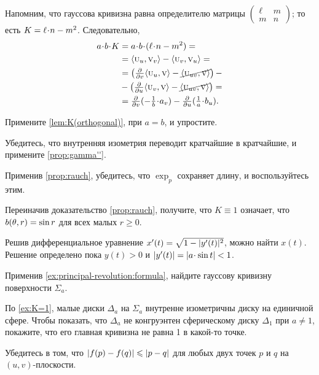 \begin{multicols}{2}
Напомним, что гауссова кривизна равна определителю матрицы $
(\begin{smallmatrix}
\ell&m
\\
m&n
\end{smallmatrix}
)
$;
то есть $K\z=\ell\cdot n-m^2$.
Следовательно, 
\begin{align*}
a\cdot b\cdot K
&=
a\cdot b\cdot(\ell\cdot n-m^2)
=
\\
&=
\langle\vec u_u,\vec v_v\rangle 
-
\langle\vec u_v,\vec v_u\rangle= 
\\
&= 
\left(
\tfrac{\partial}{\partial v}
\langle\vec u_u,\vec v\rangle
-
\cancel{\langle\vec u_{uv},\vec v\rangle}
\right)-
\\
&-
\left(
\tfrac{\partial}{\partial u}
\langle\vec u_v,\vec v\rangle
-
\cancel{\langle\vec u_{uv},\vec v\rangle}
\right)=
\\
&=\tfrac{\partial}{\partial v}(-\tfrac1{b}\cdot a_v)
-
\tfrac{\partial}{\partial u}(\tfrac1{a}\cdot b_u).
\end{align*}

Примените \ref{lem:K(orthogonal)}, при $a=b$, и упростите.

Убедитесь, что внутренняя изометрия переводит кратчайшие в кратчайшие, и примените \ref{prop:gamma''}.

Применив \ref{prop:rauch}, убедитесь, что $\exp_p$ сохраняет длину, и воспользуйтесь этим.

Переиначив доказательство \ref{prop:rauch}, получите, что $K\equiv 1$ означает, что $b(\theta,r)\z=\sin r$ для всех малых $r\ge 0$.

Решив дифференциальное уравнение $x'(t)\z=\sqrt{1-|y'(t)|^2}$, можно найти $x(t)$.
Решение определено пока $y(t)>0$ и $|y'(t)|\z=|a\cdot \sin t|<1$.

Применив \ref{ex:principal-revolution:formula}, найдите гауссову кривизну поверхности $\Sigma_a$.

По \ref{ex:K=1}, малые диски $\Delta_a$ на $\Sigma_a$ внутренне изометричны диску на единичной сфере.
Чтобы показать, что $\Delta_a$ не конгруэнтен сферическому диску $\Delta_1$ при $a\ne 1$, покажите, что его главная кривизна не равна 1 в какой-то точке.

Убедитесь в том, что $|f(p)-f(q)|\z\le |p-q|$ для любых двух точек $p$ и $q$ на $(u,v)$-плоскости.


\end{multicols}
